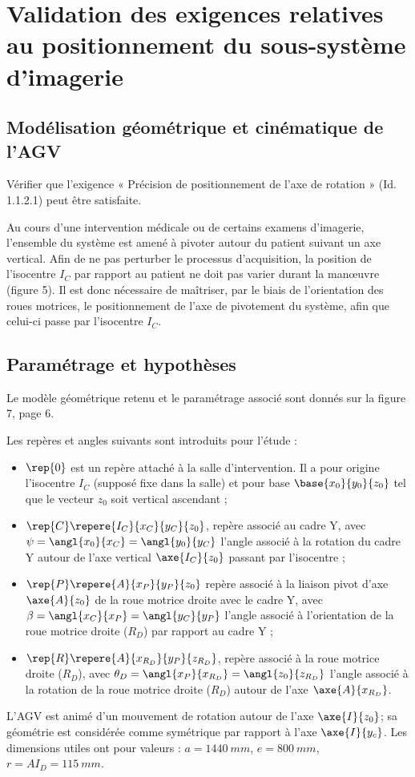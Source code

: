 \section{Validation des exigences relatives au positionnement du sous-système d’imagerie}
\subsection{Modélisation géométrique et cinématique de l’AGV}
\begin{obj}
Vérifier que l’exigence « Précision de positionnement de l’axe de rotation » (Id. 1.1.2.1) peut
être satisfaite.
\end{obj}


Au cours d’une intervention médicale ou de certains examens d’imagerie, l’ensemble du système
est amené à pivoter autour du patient suivant un axe vertical. Afin de ne pas perturber le processus
d’acquisition, la position de l’isocentre $I_C$ par rapport au patient ne doit pas varier durant la manœuvre
(figure 5). Il est donc nécessaire de maîtriser, par le biais de l’orientation des roues motrices, le
positionnement de l’axe de pivotement du système, afin que celui-ci passe par l’isocentre $I_C$.

\subsection*{Paramétrage et hypothèses}

Le modèle géométrique retenu et le paramétrage associé sont donnés sur la figure 7, page 6.

Les repères et angles suivants sont introduits pour l’étude :
\begin{itemize}
\item $\rep{0}$ est un repère attaché à la salle d’intervention. Il a pour origine l’isocentre $I_C$ (supposé fixe
dans la salle) et pour base $\base{x_{0}}{y_{0}}{z_{0}}$ tel que le vecteur $z_{0}$ soit vertical ascendant ;
\item $\rep{C} \repere{I_C}{x_{C}}{y_{C}}{z_{0}}$, repère associé au cadre Y, avec $\psi = \angl{x_{0}}{x_{C}}= \angl{y_{0}}{y_{C}}$ l’angle associé à la
rotation du cadre Y autour de l’axe vertical $\axe{I_C}{z_{0}}$ passant par l’isocentre ;
\item $\rep{P}\repere{A}{x_{P}}{y_{P}}{z_{0}}$ repère associé à la liaison pivot d’axe $\axe{A}{z_{0}}$ de la roue motrice droite avec le
cadre Y, avec $\beta = \angl{x_{C}}{x_{P}}= \angl{y_{C}}{y_{P}}$ l’angle associé à l’orientation de la roue motrice droite
($R_D$) par rapport au cadre Y ;
\item $\rep{R}\repere{A}{x_{R_D}}{y_{P}}{z_{R_D}}$, repère associé à la roue motrice droite ($R_D$), avec $\theta_D = \angl{x_{P}}{x_{R_D}}= \angl{z_{0}}{z_{R_D}}$ 
l’angle associé à la rotation de la roue motrice droite ($R_D$) autour de l’axe $\axe{A}{x_{R_D}}$.
\end{itemize}

L’AGV est animé d’un mouvement de rotation autour de l’axe $\axe{I}{z_0}$; sa géométrie est considérée
comme symétrique par rapport à l’axe $\axe{I}{y_c}$.
Les dimensions utiles ont pour valeurs : $a = \SI{1 440}{mm}$, $e = \SI{800}{mm}$, $r = AI_D = \SI{115}{mm}$.

